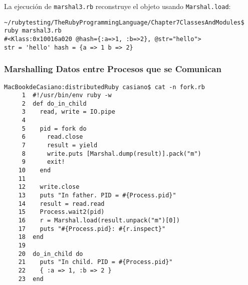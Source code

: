 La ejecución de \verb|marshal3.rb| 
reconstruye el objeto usando \verb|Marshal.load|:
\begin{verbatim}
~/rubytesting/TheRubyProgrammingLanguage/Chapter7ClassesAndModules$ ruby marshal3.rb
#<Klass:0x10016a020 @hash={:a=>1, :b=>2}, @str="hello">
str = 'hello' hash = {a => 1 b => 2}
\end{verbatim}

\subsubsection{Marshalling Datos entre Procesos que se Comunican}
\label{section:forkandmarshalling}

\begin{verbatim}
MacBookdeCasiano:distributedRuby casiano$ cat -n fork.rb
     1  #!/usr/bin/env ruby -w
     2  def do_in_child
     3    read, write = IO.pipe
     4  
     5    pid = fork do
     6      read.close
     7      result = yield
     8      write.puts [Marshal.dump(result)].pack("m")
     9      exit!
    10    end
    11  
    12    write.close
    13    puts "In father. PID = #{Process.pid}"
    14    result = read.read
    15    Process.wait2(pid)
    16    r = Marshal.load(result.unpack("m")[0])
    17    puts "#{Process.pid}: #{r.inspect}"
    18  end
    19  
    20  do_in_child do
    21    puts "In child. PID = #{Process.pid}"
    22    { :a => 1, :b => 2 } 
    23  end
\end{verbatim}
%
%
